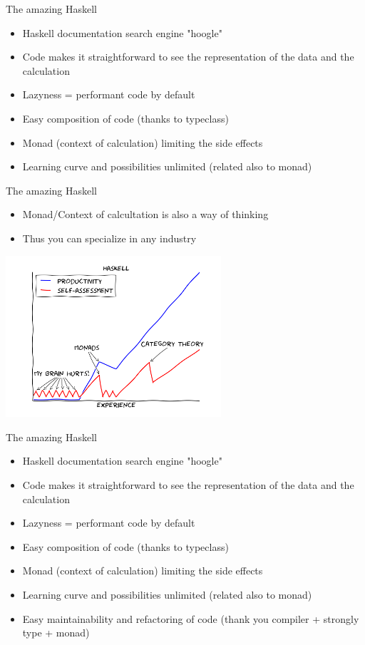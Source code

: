 \documentclass[10pt]{beamer}
\begin{document}
\begin{frame}{The amazing Haskell}
\begin{itemize}
\item Haskell documentation search engine "hoogle"
\item Code makes it straightforward to see the representation of the data and the calculation
\item Lazyness = performant code by default
\item Easy composition of code (thanks to typeclass)
\item Monad (context of calculation) limiting the side effects
\item Learning curve and possibilities unlimited (related also to monad)
\end{itemize}
\end{frame}

\begin{frame}[fragile]{The amazing Haskell} 
\begin{itemize}
\item Monad/Context of calcultation is also a way of thinking
\item Thus you can specialize in any industry
\end{itemize}
\begin{center}
\includegraphics[height=6cm]{monad-haskell-learning-curves.png}
\end{center}
\end{frame} 

\begin{frame}{The amazing Haskell}
\begin{itemize}
\item Haskell documentation search engine "hoogle"
\item Code makes it straightforward to see the representation of the data and the calculation
\item Lazyness = performant code by default
\item Easy composition of code (thanks to typeclass)
\item Monad (context of calculation) limiting the side effects
\item Learning curve and possibilities unlimited (related also to monad)
\item Easy maintainability and refactoring of code (thank you compiler + strongly type + monad)
\end{itemize}
\end{frame}
\end{document}
